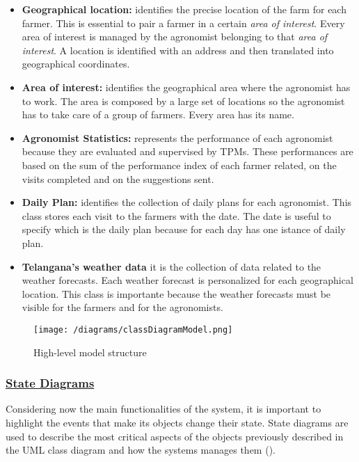 \begin{itemize}
		\item \textbf{Geographical location:} identifies the precise location of the farm for each farmer. This is essential to pair a farmer in a certain \textit{area of interest}. Every area of interest is managed by the agronomist belonging to that \textit{area of interest}. A location is identified with an address and then translated into geographical coordinates. 
		
		\item \textbf{Area of interest:} identifies the geographical area where the agronomist has to work. The area is composed by a large set of locations so the agronomist has to take care of a group of farmers. Every area has its name.
		
		\item \textbf{Agronomist Statistics:} represents the performance of each agronomist because they are evaluated and supervised by TPMs. These performances are based on the sum of the performance index of each farmer related, on the visits completed and on the suggestions sent.
		
		\item \textbf{Daily Plan:} identifies the collection of daily plans for each agronomist. This class stores each visit to the farmers with the date. The date is useful to specify which is the daily plan because for each day has one istance of daily plan.
		
		\item \textbf{Telangana's weather data} it is the collection of data related to the weather forecasts. Each weather forecast is personalized for each geographical location. This class is importante because the weather forecasts must be visible for the farmers and for the agronomists.
	\end{itemize}
	
	\begin{figure}[h!]
		\centering
		\texttt{[image: /diagrams/classDiagramModel.png]}
		\caption{\label{fig:classDiagram}High-level model structure}
	\end{figure}

	\FloatBarrier
	
	\subsubsection[State Diagrams]{\hyperlink{toc}{State Diagrams}}
	\label{sec:stateDiagrams}
		Considering now the main functionalities of the system, it is important to highlight the events that make its objects change their state. State diagrams are used to describe the most critical aspects of the objects previously described in the UML class diagram and how the systems manages them ().
		
